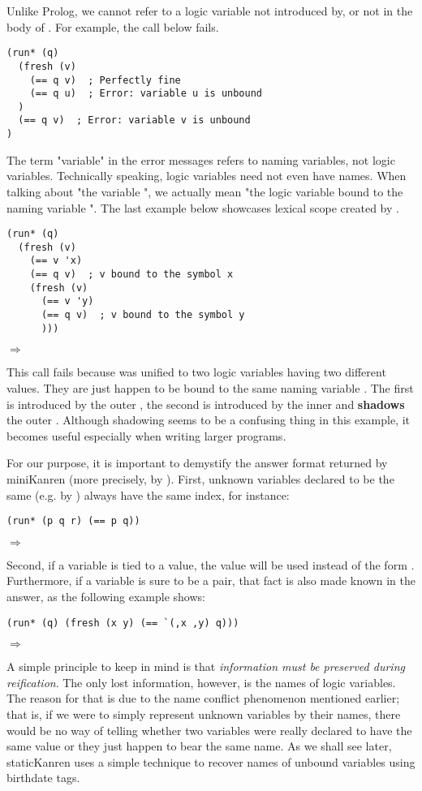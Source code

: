 Unlike Prolog, we cannot refer to a logic variable not introduced by, or not in the body of . For example, the call below fails.
\begin{lstlisting}
(run* (q)
  (fresh (v)
    (== q v)  ; Perfectly fine
    (== q u)  ; Error: variable u is unbound
  )
  (== q v)  ; Error: variable v is unbound
)
\end{lstlisting}
The term "variable" in the error messages refers to naming variables, not logic variables. Technically speaking, logic variables need not even have names. When talking about "the variable ", we actually mean "the logic variable bound to the naming variable ". The last example below showcases lexical scope created by .
\begin{lstlisting}
(run* (q)
  (fresh (v)
    (== v 'x)
    (== q v)  ; v bound to the symbol x
    (fresh (v)
      (== v 'y)
      (== q v)  ; v bound to the symbol y
      )))
\end{lstlisting}
$\Rightarrow$ \code{()}

This call fails because  was unified to two logic variables having two different values. They are just happen to be bound to the same naming variable . The first  is introduced by the outer , the second  is introduced by the inner  and \textbf{shadows} the outer . Although shadowing seems to be a confusing thing in this example, it becomes useful especially when writing larger programs.

For our purpose, it is important to demystify the answer format returned by miniKanren (more precisely, by ). First, unknown variables declared to be the same (e.g. by \code{==}) always have the same index, for instance:
\begin{lstlisting}
(run* (p q r) (== p q))
\end{lstlisting}
$\Rightarrow$ 

Second, if a variable is tied to a value, the value will be used instead of the form . Furthermore, if a variable is sure to be a pair, that fact is also made known in the answer, as the following example shows:
\begin{lstlisting}
(run* (q) (fresh (x y) (== `(,x ,y) q)))
\end{lstlisting}
$\Rightarrow$ 

A simple principle to keep in mind is that \textit{information must be preserved during reification}. The only lost information, however, is the names of logic variables. The reason for that is due to the name conflict phenomenon mentioned earlier; that is, if we were to simply represent unknown variables by their names, there would be no way of telling whether two variables were really declared to have the same value or they just happen to bear the same name. As we shall see later, staticKanren uses a simple technique to recover names of unbound variables using birthdate tags.

